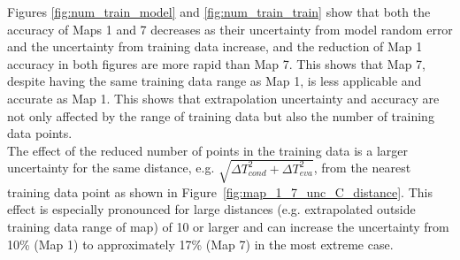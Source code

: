 Figures \ref{fig:num_train_model} and \ref{fig:num_train_train} show that both the accuracy of Maps 1 and 7 decreases as their uncertainty from model random error and the uncertainty from training data increase, and the reduction of Map 1 accuracy in both figures are more rapid than Map 7. This shows that Map 7, despite having the same training data range as Map 1, is less applicable and accurate as Map 1. This shows that extrapolation uncertainty and accuracy are not only affected by the range of training data but also the number of training data points.\\

The effect of the reduced number of points in the training data is a larger uncertainty for the same distance, e.g. $\sqrt{\Delta T_{cond}^2 + \Delta T_{eva}^2}$, from the nearest training data point as shown in Figure~\ref{fig:map_1_7_unc_C_distance}.  This effect is especially pronounced for large distances (e.g. extrapolated outside training data range of map) of 10\dgC{} or larger and can increase the uncertainty from 10\% (Map 1) to approximately 17\% (Map 7) in the most extreme case.

